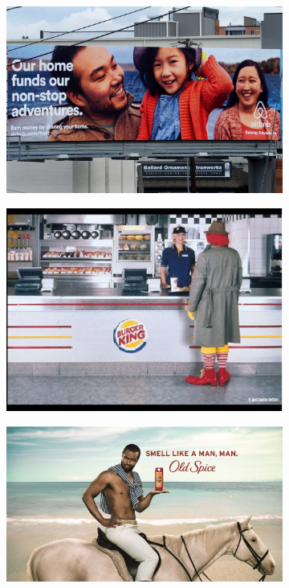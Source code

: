 \begin{figure}
    \centering
    \begin{subfigure}[b]{0.22\textwidth}
         \centering
         \includegraphics[width=\textwidth,scale=0.6]{images/airbnb.jpeg}
         \caption{}
         \label{fig:Airbib}
     \end{subfigure}
     \begin{subfigure}[b]{0.2\textwidth}
         \centering
         \includegraphics[width=\textwidth,scale=0.5]{images/Burger-King-vs-McDonalds-comparative-ad.png}
         \caption{}
         \label{fig:mcdonald}
     \end{subfigure}
     \begin{subfigure}[b]{0.27\textwidth}
         \centering
         \includegraphics[width=\textwidth,scale=1.0]{images/old-spice.jpeg}

\end{subfigure}
\end{figure}
